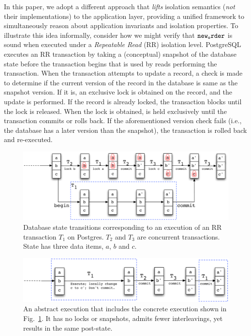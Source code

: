 In this paper, we adopt a different approach that \emph{lifts}
isolation semantics (\emph{not} their implementations) to the
application layer, providing a unified framework to simultaneously
reason about application invariants and isolation properties.  To
illustrate this idea informally, consider how we might verify that
${\tt new_order}$ is sound when executed under a \emph{Repeatable Read}
(RR) isolation level.  PostgreSQL executes an RR transaction by taking
a (conceptual) snapshot of the database state before the transaction
begins that is used by reads performing the transaction.  When the
transaction attempts to update a record, a check is made to determine
if the current version of the record in the database is same as the
snapshot version. If it is, an exclusive lock is obtained on the
record, and the update is performed. If the record is already locked,
the transaction blocks until the lock is released.  When the lock is
obtained, is held exclusively until the transaction commits or rolls
back. If the aforementioned version check fails (i.e., the database
has a later version than the snapshot), the transaction is rolled back
and re-executed.

\begin{figure}[t]
\includegraphics[scale=0.5]{Figures/RR-postgres}
\caption{Database state transitions corresponding to an execution of
  an RR transaction $T_1$ on Postgres. $T_2$ and $T_3$ are concurrent
  transactions. State has three data items, $a$, $b$ and $c$. }
\label{fig:rr-postgres}
\end{figure}
\begin{figure}[t]
\includegraphics[scale=0.5]{Figures/RR-abstract}
  \caption{An abstract execution that includes the concrete execution
  shown in Fig.~\ref{fig:rr-postgres}. It has no locks or snapshots,
  admits fewer interleavings, yet results in the same post-state.  }
\label{fig:rr-abstract}
\end{figure}

